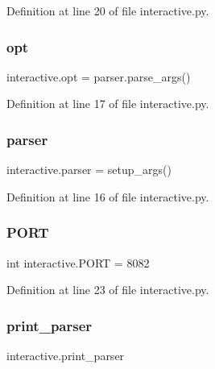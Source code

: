 Definition at line 20 of file interactive.\+py.

\mbox{\label{namespaceinteractive_a4b1cc0a00aa97ce62621d2a9996fe6ff}} 
\subsubsection{\texorpdfstring{opt}{opt}}
{\footnotesize\ttfamily interactive.\+opt = parser.\+parse\+\_\+args()}



Definition at line 17 of file interactive.\+py.

\mbox{\label{namespaceinteractive_affc28a281e9fbc688b1515e62dc694db}} 
\subsubsection{\texorpdfstring{parser}{parser}}
{\footnotesize\ttfamily interactive.\+parser = setup\+\_\+args()}



Definition at line 16 of file interactive.\+py.

\mbox{\label{namespaceinteractive_a29341b624435b00b983e5a91adfdc374}} 
\subsubsection{\texorpdfstring{P\+O\+RT}{PORT}}
{\footnotesize\ttfamily int interactive.\+P\+O\+RT = 8082}



Definition at line 23 of file interactive.\+py.

\mbox{\label{namespaceinteractive_abf63ff4b74ab5876420db088893db0f7}} 
\subsubsection{\texorpdfstring{print\+\_\+parser}{print\_parser}}
{\footnotesize\ttfamily interactive.\+print\+\_\+parser}



